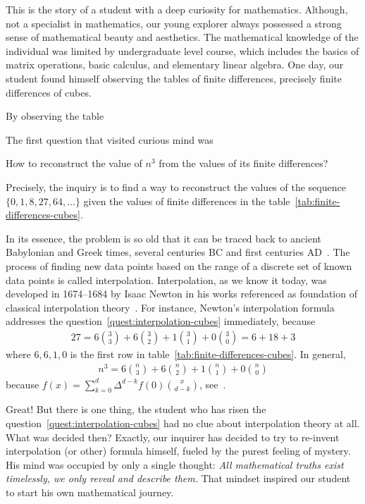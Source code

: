 This is the story of a student with a deep curiosity for mathematics.
Although, not a specialist in mathematics,
our young explorer always possessed a strong sense of mathematical beauty and aesthetics.
The mathematical knowledge of the individual was limited by undergraduate level course, which includes the basics of
matrix operations, basic calculus, and elementary linear algebra.
One day, our student found himself observing the tables of finite differences, precisely finite differences of cubes.

By observing the table

The first question that visited curious mind was
\begin{question}
    \label{quest:interpolation-cubes}
    How to reconstruct the value of $n^3$ from the values of its finite differences?
\end{question}
Precisely, the inquiry is to find a way to reconstruct the values of the sequence $\{0, 1, 8, 27, 64, \ldots\}$
given the values of finite differences in the table~\eqref{tab:finite-differences-cubes}.

In its essence, the problem is so old that it can be traced back
to ancient Babylonian and Greek times, several centuries BC and first centuries AD~\cite{gautschi2012interpolation}.
The process of finding new data points based on the range of a discrete set
of known data points is called interpolation.
Interpolation, as we know it today, was developed in 1674--1684 by Isaac Newton
in his works referenced as foundation of classical interpolation theory~\cite{meijering2002chronology}.
For instance, Newton's interpolation formula addresses the question~\eqref{quest:interpolation-cubes} immediately,
because
\begin{align*}
    27 = 6 \binom{3}{3} + 6 \binom{3}{2} + 1 \binom{3}{1} + 0\binom{3}{0} = 6 + 18 + 3
\end{align*}
where $6,6,1,0$ is the first row in table~\eqref{tab:finite-differences-cubes}.
In general,
\begin{align*}
    n^3 = 6 \binom{n}{3} + 6 \binom{n}{2} + 1\binom{n}{1} + 0 \binom{n}{0}
\end{align*}
because $f(x) = \sum_{k=0}^{d} \Delta^{d-k} f(0) \binom{x}{d-k}$, see~\cite[~p. 190]{graham1994concrete}.

Great!
But there is one thing, the student who has risen the question~\eqref{quest:interpolation-cubes}
had no clue about interpolation theory at all.
What was decided then?
Exactly, our inquirer has decided to try to re-invent interpolation (or other) formula himself,
fueled by the purest feeling of mystery.
His mind was occupied by only a single thought:
\textit{All mathematical truths exist timelessly, we only reveal and describe them.}
That mindset inspired our student to start his own mathematical journey.


